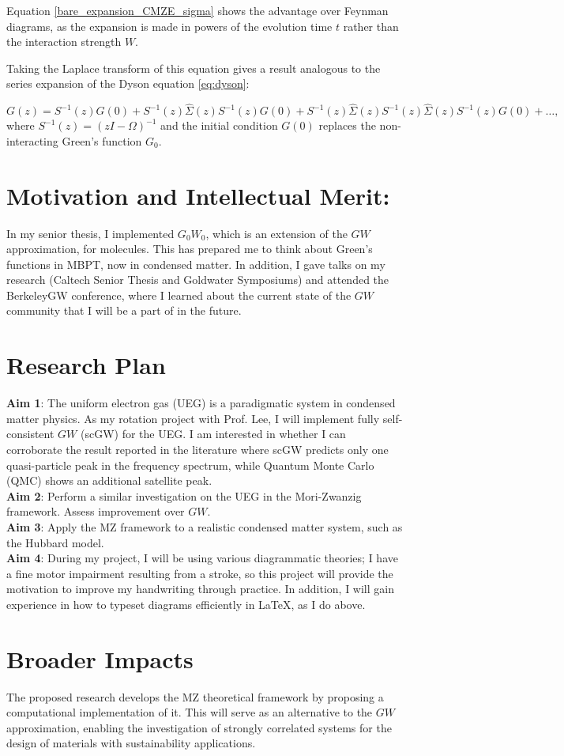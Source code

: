 \documentclass[12pt]{article}
\begin{document}
Equation \ref{bare_expansion_CMZE_sigma} shows the advantage over Feynman diagrams, as the expansion is made in powers of the evolution time \( t \) rather than the interaction strength \( W \). 

Taking the Laplace transform of this equation gives a result analogous to the series expansion of the Dyson equation \ref{eq:dyson}:

\begin{equation}
   G(z)=S^{-1}(z) G(0)+S^{-1}(z) \hat{\Sigma}(z) S^{-1}(z) G(0)+S^{-1}(z) \hat{\Sigma}(z) S^{-1}(z) \hat{\Sigma}(z) S^{-1}(z) G(0)+\ldots,
\end{equation}
where \( S^{-1}(z)=(z I-\Omega)^{-1} \) and the initial condition $G(0)$ replaces the non-interacting Green's function \( G_0 \).

\section*{Motivation and Intellectual Merit:}
In my senior thesis, I implemented $G_0W_0$, which is an extension of the $GW$ approximation, for molecules. This has prepared me to think about Green's functions in MBPT, now in condensed matter. In addition, I gave talks on my research (Caltech Senior Thesis and Goldwater Symposiums) and attended the BerkeleyGW conference, where I learned about the current state of the $GW$ community that I will be a part of in the future.

\section*{Research Plan}
\textbf{Aim 1}: The uniform electron gas (UEG) is a paradigmatic system in condensed matter physics. As my rotation project with Prof. Lee, I will implement fully self-consistent $GW$ (scGW) for the UEG. I am interested in whether I can corroborate the result reported in the literature where scGW predicts only one quasi-particle peak in the frequency spectrum, while Quantum Monte Carlo (QMC) shows an additional satellite peak.\\
\textbf{Aim 2}: Perform a similar investigation on the UEG in the Mori-Zwanzig framework. Assess improvement over $GW$.\\
\textbf{Aim 3}: Apply the MZ framework to a realistic condensed matter system, such as the Hubbard model.\\
\textbf{Aim 4}: During my project, I will be using various diagrammatic theories; I have a fine motor impairment resulting from a stroke, so this project will provide the motivation to improve my handwriting through practice. In addition, I will gain experience in how to typeset diagrams efficiently in LaTeX, as I do above.

\section*{Broader Impacts}
The proposed research develops the MZ theoretical framework by proposing a computational implementation of it. This will serve as an alternative to the $GW$ approximation, enabling the investigation of strongly correlated systems for the design of materials with sustainability applications. 
\end{document}
